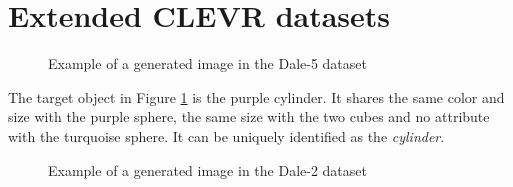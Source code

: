 \documentclass[11pt]{article}
\begin{document}
\section{Extended CLEVR datasets}
\label{sec:extended-datasets}
\begin{figure}[h]
  \centering
  \caption{Example of a generated image in the Dale-5 dataset}
  \label{fig:clevr-dale-5}
\end{figure}
The target object in Figure \ref{fig:clevr-dale-5} is the purple cylinder. It shares the same color and size with the purple sphere, the same size with the two cubes and no attribute with the turquoise sphere. It can be uniquely identified as the \emph{cylinder}.

\begin{figure}[h]
  \centering
  \caption{Example of a generated image in the Dale-2 dataset}
  \label{fig:clevr-dale-2}
\end{figure}
\end{document}
